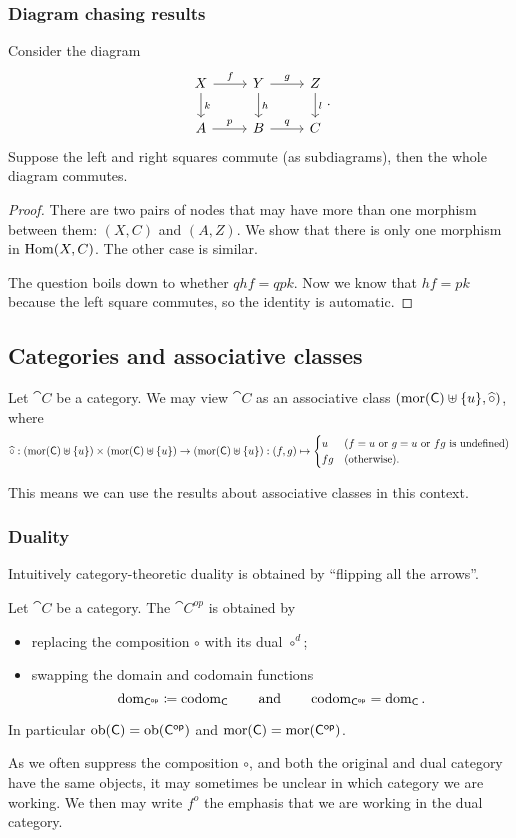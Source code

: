 \subsubsection{Diagram chasing results}
\begin{lemma} \label{commutingRectangle}
Consider the diagram
\[ \begin{tikzcd}
X \rar{f}\dar{k} & Y \rar{g}\dar{h} & Z\dar{l} \\
A \rar{p} & B \rar{q} & C
\end{tikzcd}. \]
Suppose the left and right squares commute (as subdiagrams), then the whole diagram commutes.
\end{lemma}
\begin{proof}
There are two pairs of nodes that may have more than one morphism between them: $(X,C)$ and $(A,Z)$. We show that there is only one morphism in $\operatorname{Hom}(X,C)$. The other case is similar.

The question boils down to whether $qhf = qpk$. Now we know that $hf = pk$ because the left square commutes, so the identity is automatic.
\end{proof}

\subsection{Categories and associative classes}
\begin{lemma}
Let $\cat{C}$ be a category. We may view $\cat{C}$ as an associative class $\left( \operatorname{mor}(\mathsf{C})\uplus \{u\}, \widehat{\circ} \right)$, where
\[ \widehat{\circ}: (\operatorname{mor}(\mathsf{C})\uplus \{u\}) \times (\operatorname{mor}(\mathsf{C})\uplus \{u\}) \to (\operatorname{mor}(\mathsf{C})\uplus \{u\}): (f,g) \mapsto \begin{cases}
u & (\text{$f=u$ or $g=u$ or $fg$ is undefined}) \\
fg & (\text{otherwise}).
\end{cases} \]
\end{lemma}
This means we can use the results about associative classes in this context.

\subsubsection{Duality}
Intuitively category-theoretic duality is obtained by ``flipping all the arrows''.
\begin{definition}
Let $\cat{C}$ be a category. The  $\cat{C^{op}}$ is obtained by
\begin{itemize}
\item replacing the composition $\circ$ with its dual $\circ^d$;
\item swapping the domain and codomain functions
\[ \operatorname{dom}_{\mathsf{C^{op}}} \coloneqq \operatorname{codom}_{\mathsf{C}} \qquad \text{and} \qquad \operatorname{codom}_{\mathsf{C^{op}}} = \operatorname{dom}_{\mathsf{C}}.  \]
\end{itemize}
In particular $\operatorname{ob}(\mathsf{C}) = \operatorname{ob}(\mathsf{C^{op}})$ and $\operatorname{mor}(\mathsf{C}) = \operatorname{mor}(\mathsf{C^{op}})$.
\end{definition}
As we often suppress the composition $\circ$, and both the original and dual category have the same objects, it may sometimes be unclear in which category we are working. We then may write $f^o$ the emphasis that we are working in the dual category.

